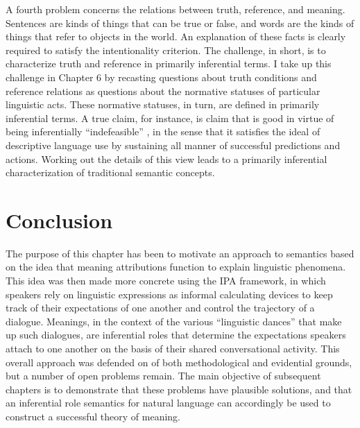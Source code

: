 A fourth problem concerns the relations between truth, reference, and meaning. Sentences are kinds of things that can be true or false, and words are the kinds of things that refer to objects in the world. An explanation of these facts is clearly required to satisfy the intentionality criterion. The challenge, in short, is to characterize truth and reference in primarily inferential terms. I take up this challenge in Chapter 6 by recasting questions about truth conditions and reference relations as questions about the normative statuses of particular linguistic acts. These normative statuses, in turn, are defined in primarily inferential terms. A true claim, for instance, is claim that is good in virtue of being inferentially ``indefeasible'' \citep{Misak:2013}, in the sense that it satisfies the ideal of descriptive language use by sustaining all manner of successful predictions and actions. Working out the details of this view leads to a primarily inferential characterization of traditional semantic concepts.

\section{Conclusion}

The purpose of this chapter has been to motivate an approach to semantics based on the idea that meaning attributions function to explain linguistic phenomena. This idea was then made more concrete using the IPA framework, in which speakers rely on linguistic expressions as informal calculating devices to keep track of their expectations of one another and control the trajectory of a dialogue. Meanings, in the context of the various ``linguistic dances'' that make up such dialogues, are inferential roles that determine the expectations speakers attach to one another on the basis of their shared conversational activity. This overall approach was defended on of both methodological and evidential grounds, but a number of open problems remain. The main objective of subsequent chapters is to demonstrate that these problems have plausible solutions, and that an inferential role semantics for natural language can accordingly be used to construct a successful theory of meaning.
